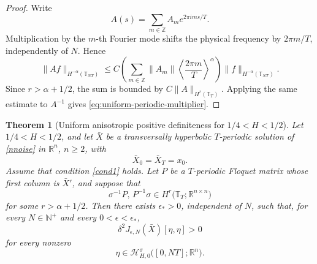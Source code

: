 \documentclass[preprint,12pt]{elsarticle}
\newtheorem{theorem}{Theorem}[section]
\theoremstyle{definition}
\theoremstyle{plain}
\begin{document}
\begin{proof}
Write
\begin{equation*}
    A(s)
    =
    \sum_{m\in\mathbb Z}
    A_m e^{2\pi ims/T}.
\end{equation*}
Multiplication by the $m$-th Fourier mode shifts the physical frequency
by $2\pi m/T$, independently of $N$. Hence
\begin{equation*}
    \|Af\|_{H^{-\alpha}(\mathbb T_{NT})}
    \leq
    C
    \left(
        \sum_{m\in\mathbb Z}
        \|A_m\|
        \left\langle\frac{2\pi m}{T}\right\rangle^\alpha
    \right)
    \|f\|_{H^{-\alpha}(\mathbb T_{NT})}.
\end{equation*}
Since $r>\alpha+1/2$, the sum is bounded by
$C\|A\|_{H^r(\mathbb T_T)}$. Applying the same estimate to $A^{-1}$
gives \eqref{eq:uniform-periodic-multiplier}.
\end{proof}

\begin{theorem}[Uniform anisotropic positive definiteness for
$1/4<H<1/2$]
\label{thm:persistence-H-lesshalf}
Let $1/4<H<1/2$, and let $\bar X$ be a transversally hyperbolic
$T$-periodic solution of \eqref{nnoise} in $\mathbb R^n$, $n\geq2$,
with
\begin{equation*}
    \bar X_0=\bar X_T=x_0.
\end{equation*}
Assume that condition \eqref{cond1} holds. Let $P$ be a $T$-periodic
Floquet matrix whose first column is $\bar X'$, and suppose that
\begin{equation*}
    \sigma^{-1}P,\,
    P^{-1}\sigma
    \in
    H^r
    \bigl(
        \mathbb T_T;\mathbb R^{n\times n}
    \bigr)
\end{equation*}
for some $r>\alpha+1/2$. Then there exists $\epsilon_*>0$, independent
of $N$, such that, for every $N\in\mathbb N^+$ and every
$0<\epsilon<\epsilon_*$,
\begin{equation*}
    \delta^2J_{\epsilon,N}(\bar X)[\eta,\eta]>0
\end{equation*}
for every nonzero
\begin{equation*}
    \eta\in
    \mathcal H_{H,0}^{\sigma}
    \bigl([0,NT];\mathbb R^n\bigr).
\end{equation*}
\end{theorem}
\end{document}
